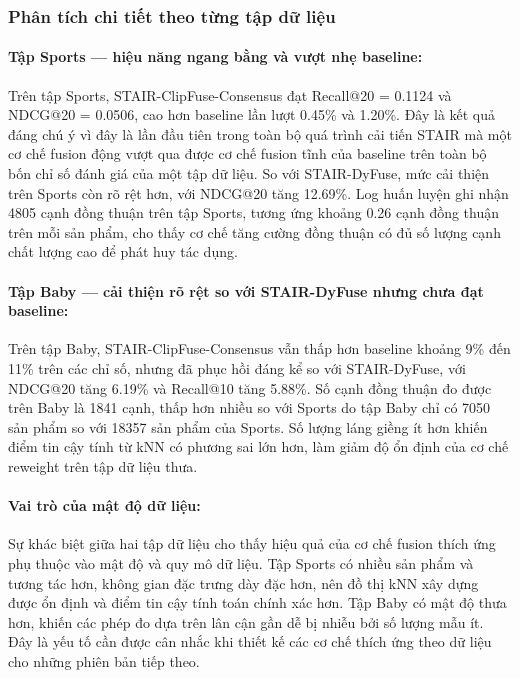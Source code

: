 \begin{longtable}
\subsubsection{Phân tích chi tiết theo từng tập dữ liệu}
 
\paragraph{Tập Sports — hiệu năng ngang bằng và vượt nhẹ baseline:}
Trên tập Sports, STAIR-ClipFuse-Consensus đạt Recall@20 = 0.1124 và NDCG@20 = 0.0506, cao hơn baseline lần lượt 0.45\% và 1.20\%. Đây là kết quả đáng chú ý vì đây là lần đầu tiên trong toàn bộ quá trình cải tiến STAIR mà một cơ chế fusion động vượt qua được cơ chế fusion tĩnh của baseline trên toàn bộ bốn chỉ số đánh giá của một tập dữ liệu. So với STAIR-DyFuse, mức cải thiện trên Sports còn rõ rệt hơn, với NDCG@20 tăng 12.69\%. Log huấn luyện ghi nhận 4805 cạnh đồng thuận trên tập Sports, tương ứng khoảng 0.26 cạnh đồng thuận trên mỗi sản phẩm, cho thấy cơ chế tăng cường đồng thuận có đủ số lượng cạnh chất lượng cao để phát huy tác dụng.
 
\paragraph{Tập Baby — cải thiện rõ rệt so với STAIR-DyFuse nhưng chưa đạt baseline:}
Trên tập Baby, STAIR-ClipFuse-Consensus vẫn thấp hơn baseline khoảng 9\% đến 11\% trên các chỉ số, nhưng đã phục hồi đáng kể so với STAIR-DyFuse, với NDCG@20 tăng 6.19\% và Recall@10 tăng 5.88\%. Số cạnh đồng thuận đo được trên Baby là 1841 cạnh, thấp hơn nhiều so với Sports do tập Baby chỉ có 7050 sản phẩm so với 18357 sản phẩm của Sports. Số lượng láng giềng ít hơn khiến điểm tin cậy tính từ kNN có phương sai lớn hơn, làm giảm độ ổn định của cơ chế reweight trên tập dữ liệu thưa.
 
\paragraph{Vai trò của mật độ dữ liệu:}
Sự khác biệt giữa hai tập dữ liệu cho thấy hiệu quả của cơ chế fusion thích ứng phụ thuộc vào mật độ và quy mô dữ liệu. Tập Sports có nhiều sản phẩm và tương tác hơn, không gian đặc trưng dày đặc hơn, nên đồ thị kNN xây dựng được ổn định và điểm tin cậy tính toán chính xác hơn. Tập Baby có mật độ thưa hơn, khiến các phép đo dựa trên lân cận gần dễ bị nhiễu bởi số lượng mẫu ít. Đây là yếu tố cần được cân nhắc khi thiết kế các cơ chế thích ứng theo dữ liệu cho những phiên bản tiếp theo.
 

\end{longtable}
